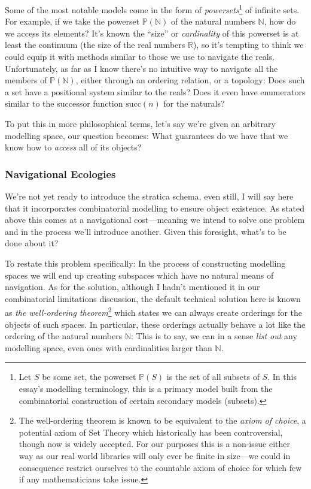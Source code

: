 \documentclass[twoside]{article}
\newcommand{\powerset}[2][P]{\ensuremath{\mathbb{#1}(#2)}}
\begin{document}
Some of the most notable models come in the form of \emph{powersets}\footnote{Let $ S $ be some set, the powerset
$ \powerset{S} $ is the set of all subsets of $ S $. In this essay's modelling terminology, this is a primary model
built from the combinatorial construction of certain secondary models (subsets).} of infinite sets. For example,
if we take the powerset $ \powerset{\mathbb{N}} $ of the natural numbers $ \mathbb{N} $, how do we access its elements?
It's known the ``size'' or \emph{cardinality} of this powerset is at least the continuum (the size of the real numbers
$ \mathbb{R} $), so it's tempting to think we could equip it with methods similar to those we use to navigate the reals.
Unfortunately, as far as I know there's no intuitive way to navigate all the members of $ \powerset{\mathbb{N}} $, either
through an ordering relation, or a topology: Does such a set have a positional system similar to the reals? Does it even
have enumerators similar to the successor function $ \mbox{succ}(n) $ for the naturals?

To put this in more philosophical terms, let's say we're given an arbitrary modelling space, our question becomes:
What guarantees do we have that we know how to \emph{access} all of its objects?

\subsubsection*{Navigational Ecologies}

We're not yet ready to introduce the stratica schema, even still, I will say here that it incorporates combinatorial
modelling to ensure object existence. As stated above this comes at a navigational cost---meaning we intend to solve
one problem and in the process we'll introduce another. Given this foresight, what's to be done about it?

To restate this problem specifically: In the process of constructing modelling spaces we will end up creating subspaces
which have no natural means of navigation. As for the solution, although I hadn't mentioned it in our combinatorial
limitations discussion, the default technical solution here is known as \emph{the well-ordering theorem}\footnote{The
well-ordering theorem is known to be equivalent to the \emph{axiom of choice}, a potential axiom of Set Theory which
historically has been controversial, though now is widely accepted. For our purposes this is a non-issue either way as
our real world libraries will only ever be finite in size---we could in consequence restrict ourselves to the countable axiom
of choice for which few if any mathematicians take issue.} which states we can always create orderings for the objects of such
spaces. In particular, these orderings actually behave a lot like the ordering of the natural numbers $ \mathbb{N} $: This
is to say, we can in a sense \emph{list out} any modelling space, even ones with cardinalities larger than $ \mathbb{N} $.
\end{document}
